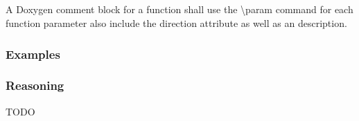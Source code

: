 \subsection*{\doxygenRule{}}

A Doxygen comment block for a function shall use the \textbackslash param command for each function parameter also include the direction attribute as well as an description.

\subsubsection*{Examples}

\noindent
\begin{minipage}[t]{0.48\textwidth}
    

\end{minipage}\hfill
\begin{minipage}[t]{0.48\textwidth}
    
\end{minipage}


\subsubsection*{Reasoning}

TODO

